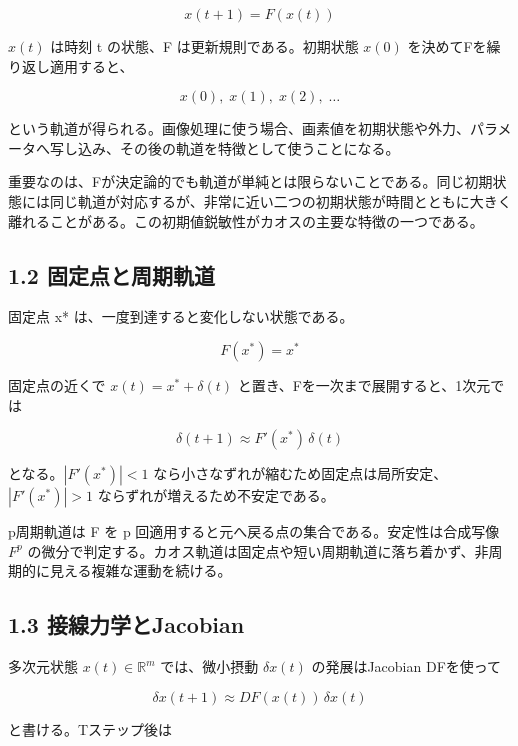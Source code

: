 \documentclass[11pt,a4paper]{ltjsarticle}
\begin{document}
\[
x(t+1)=F\!\left(x(t)\right)
\]

\(x(t)\) は時刻 t の状態、F は更新規則である。初期状態 \(x(0)\) を決めてFを繰り返し適用すると、\par

\[
x(0),\;x(1),\;x(2),\;\ldots
\]

という軌道が得られる。画像処理に使う場合、画素値を初期状態や外力、パラメータへ写し込み、その後の軌道を特徴として使うことになる。\par

重要なのは、Fが決定論的でも軌道が単純とは限らないことである。同じ初期状態には同じ軌道が対応するが、非常に近い二つの初期状態が時間とともに大きく離れることがある。この初期値鋭敏性がカオスの主要な特徴の一つである。\par

\subsection*{\textcolor{researchblue}{1.2 固定点と周期軌道}}

固定点 x* は、一度到達すると変化しない状態である。\par

\[
F(x^{\ast})=x^{\ast}
\]

固定点の近くで \(x(t)=x^{\ast}+\delta(t)\) と置き、Fを一次まで展開すると、1次元では\par

\[
\delta(t+1)\approx F'(x^{\ast})\,\delta(t)
\]

となる。\(|F'(x^{\ast})|<1\) なら小さなずれが縮むため固定点は局所安定、\(|F'(x^{\ast})|>1\) ならずれが増えるため不安定である。\par

p周期軌道は F を p 回適用すると元へ戻る点の集合である。安定性は合成写像 \(F^p\) の微分で判定する。カオス軌道は固定点や短い周期軌道に落ち着かず、非周期的に見える複雑な運動を続ける。\par

\subsection*{\textcolor{researchblue}{1.3 接線力学とJacobian}}

多次元状態 \(x(t)\in\mathbb{R}^{m}\) では、微小摂動 \(\delta x(t)\) の発展はJacobian DFを使って\par

\[
\delta x(t+1)\approx DF\!\left(x(t)\right)\,\delta x(t)
\]

と書ける。Tステップ後は\par
\end{document}
